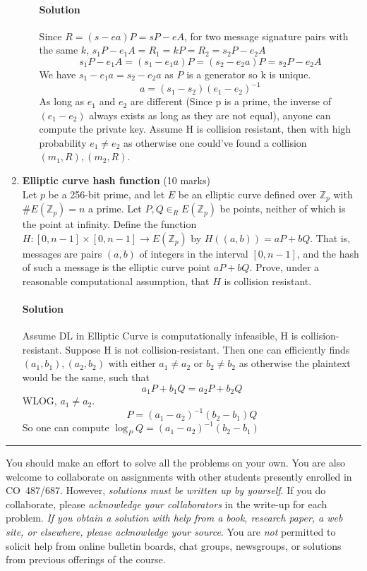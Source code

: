 \documentclass[11pt]{article}
\newcommand{\ZZ}{{\mathbb Z}}
\begin{document}
\begin{enumerate}
\begin{enumerate}
      \paragraph{Solution}
      Since $R=(s-ea)P=sP-eA$, for two message signature pairs with the same $k$, $s_1P-e_1A =R_1=kP=R_2=s_2P-e_2A$
      \[
      s_1P-e_1A =(s_1-e_1a)P = (s_2-e_2a)P=s_2P-e_2A
      \]
      We have $s_1-e_1a = s_2-e_2a$ as $P$ is a generator so k is unique.
      \[
      a = (s_1-s_2)(e_1-e_2)^{-1}
      \]
      As long as $e_1$ and $e_2$ are different (Since p is a prime, the inverse of $(e_1-e_2)$ always exists as long as they are not equal), anyone can compute the private key. Assume H is collision resistant, then with high probability $e_1\neq e_2$ as otherwise one could've found a collision $(m_1, R), (m_2, R)$.
\end{enumerate}

\newpage
\item {\bf Elliptic curve hash function} (10 marks)\\
Let $p$ be a 256-bit prime, and let $E$ be an elliptic
curve defined over $\ZZ_p$ with $\# E(\ZZ_p)=n$ a prime.
Let $P, Q \in_R E(\ZZ_p)$ be points, neither of which is the point at
infinity. Define the function $H : [0,n-1] \times [0,n-1] \longrightarrow
E(\ZZ_p)$ by $H((a,b)) = aP+bQ$. That is, messages are
pairs $(a,b)$ of integers in the interval $[0,n-1]$, and the
hash of such a message is the elliptic curve point $aP+bQ$.
Prove, under a reasonable computational assumption, that $H$ is collision
resistant.
\paragraph{Solution} Assume DL in Elliptic Curve is computationally infeasible, H is collision-resistant. Suppose H is not collision-resistant. Then one can efficiently finds $(a_1,b_1), (a_2,b_2)$ with either $a_1 \neq a_2$ or $b_2 \neq b_2$ as otherwise the plaintext would be the same, such that
\[
a_1P+b_1Q = a_2P+b_2Q
\]
WLOG, $a_1\neq a_2$.
\[ P=(a_1-a_2)^{-1}(b_2-b_1)Q
\]
So one can compute $\log_P Q = (a_1-a_2)^{-1}(b_2-b_1)$


\end{enumerate}


\hfill\hrule

\newpage
\vspace*{2mm}
\noindent
You should make an effort to solve all the problems on your own.
You are also welcome to collaborate on assignments with other students
presently enrolled in CO~487/687. However, \emph{solutions must be
written up by yourself}. If you do collaborate, please \emph{acknowledge
your collaborators} in the write-up for each problem. \emph{If you
obtain a solution with help from a book, research paper, a web site,
or elsewhere, please acknowledge your source}. You are \emph{not}
permitted to solicit help from online bulletin boards, chat groups,
newsgroups, or solutions from previous offerings of the course.
\end{document}
